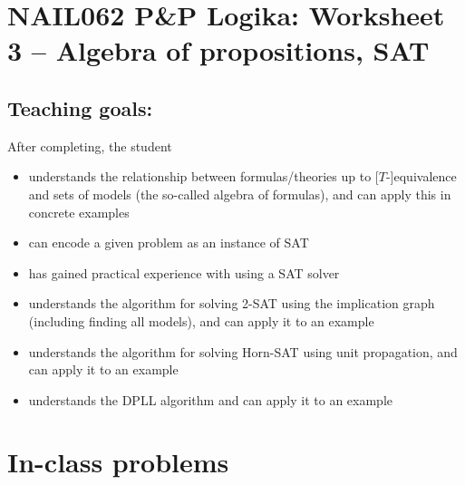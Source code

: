 \section*{NAIL062 P\&P Logika: Worksheet 3 -- Algebra of propositions, SAT}

\subsection*{Teaching goals:} After completing, the student

\begin{itemize}\setlength{\itemsep}{0pt}
    \item understands the relationship between formulas/theories up to [$T$-]equivalence and sets of models (the so-called algebra of formulas), and can apply this in concrete examples
    \item can encode a given problem as an instance of SAT
    \item has gained practical experience with using a SAT solver
    \item understands the algorithm for solving 2-SAT using the implication graph (including finding all models), and can apply it to an example
    \item understands the algorithm for solving Horn-SAT using unit propagation, and can apply it to an example
    \item understands the DPLL algorithm and can apply it to an example
\end{itemize}


\section*{In-class problems}


